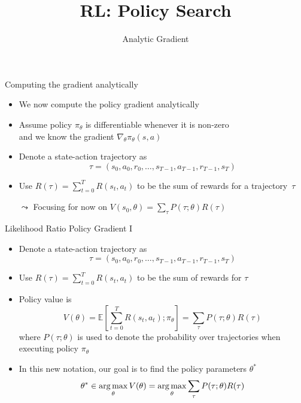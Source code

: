 \documentclass[aspectratio=169]{../latex_main/tntbeamer}  %
\title[RL: Analytic Gradient]{RL: Policy Search}
\subtitle{Analytic Gradient}
\begin{document}
	
	\maketitle

\begin{frame}[c]{Computing the gradient analytically}

\begin{itemize}
	\item We now compute the policy gradient analytically
	\item Assume policy $\pi_\theta$ is differentiable whenever it is non-zero\\
	 and we know the gradient $\nabla_\theta \pi_\theta (s,a)$
	\item Denote a state-action trajectory as 
	$$ \tau = (s_0, a_0, r_0, \ldots, s_{T-1}, a_{T-1}, r_{T-1}, s_T) $$
	\item Use $R(\tau) = \sum_{t=0}^{T} R(s_t, a_t)$ to be the sum of rewards for a trajectory~$\tau$
	\item[$\leadsto$] Focusing for now on $V(s_0, \theta) = \sum_\tau P(\tau; \theta) R(\tau)$ 
	
\end{itemize}

\end{frame}
\begin{frame}[c]{Likelihood Ratio Policy Gradient I }
	
	\begin{itemize}
		\item Denote a state-action trajectory as 
		$$ \tau = (s_0, a_0, r_0, \ldots, s_{T-1}, a_{T-1}, r_{T-1}, s_T) $$
		\item Use $R(\tau) = \sum_{t=0}^{T} R(s_t, a_t)$ to be the sum of rewards for $\tau$
		\item Policy value is 
		$$V(\theta) = \mathbb{E}\left[\sum_{t=0}^T R(s_t, a_t); \pi_\theta \right] = \sum_{\tau} P(\tau; \theta)R(\tau) $$
		where $P(\tau; \theta)$ is used to denote the probability over trajectories when executing policy $\pi_\theta$
		\item In this new notation, our goal is to find the policy parameters $\theta^*$
		$$\theta^* \in \operatorname*{arg\,max}_{\theta} V(\theta) = \operatorname*{arg\,max}_{\theta}\sum_{\tau} P(\tau; \theta) R(\tau) $$
		
	\end{itemize}
	
\end{frame}
\end{document}
